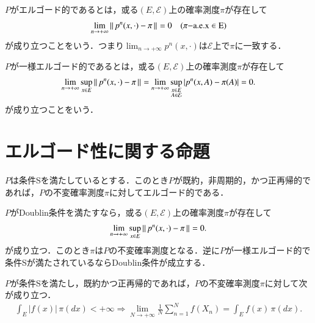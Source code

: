 	\begin{dfn}[エルゴード性]
		$P$がエルゴード的であるとは，或る$(E,\mathcal{E})$上の確率測度$\pi$が存在して
		\begin{align}
			\lim_{n \to +\infty} \left\|\, p^n(x,\cdot) - \pi\, \right\|_{} = 0 \quad (\pi \rm{-a.e.}x \in E)
		\end{align}
		が成り立つことをいう．つまり$\displaystyle \lim_{n \to +\infty} p^n(x,\cdot)$は$\mathcal{E}$上で$\pi$に一致する．
	\end{dfn}
	
	\begin{dfn}[一様エルゴード性]
		$P$が一様エルゴード的であるとは，或る$(E,\mathcal{E})$上の確率測度$\pi$が存在して
		\begin{align}
			\lim_{n \to +\infty} \operatorname*{sup}_{x \in E} \left\|\, p^n(x,\cdot) - \pi\, \right\|_{} = \lim_{n \to +\infty} \operatorname*{sup}_{\substack{x \in E \\ A \in \mathcal{E}}} \left| p^n(x,A) - \pi(A)\right| =0.
		\end{align}
		が成り立つことをいう．
	\end{dfn}
	
\section{エルゴード性に関する命題}
	\begin{prp}[エルゴード性]
		$P$は条件Sを満たしているとする．このとき$P$が既約，非周期的，かつ正再帰的であれば，$P$の不変確率測度$\pi$に対してエルゴード的である．
	\end{prp}
	
	\begin{prp}[一様エルゴード性]
		$P$がDoublin条件を満たすなら，或る$(E,\mathcal{E})$上の確率測度$\pi$が存在して
		\begin{align}
			\lim_{n \to +\infty} \operatorname*{sup}_{x \in E} \left\|\, p^n(x,\cdot) - \pi\, \right\|_{} = 0.
		\end{align}
		が成り立つ．このとき$\pi$は$P$の不変確率測度となる．逆に$P$が一様エルゴード的で条件Sが満たされているならDoublin条件が成立する．
	\end{prp}
	
	\begin{prp}[大数の法則]
		$P$が条件Sを満たし，既約かつ正再帰的であれば，$P$の不変確率測度$\pi$に対して次が成り立つ．
		\begin{align}
			\int_E |f(x)|\, \pi(dx) < +\infty \Rightarrow \lim_{N \to +\infty} \frac{1}{N} \sum_{n=1}^{N} f(X_n) = \int_E f(x)\, \pi(dx).
		\end{align}
	\end{prp}
	
